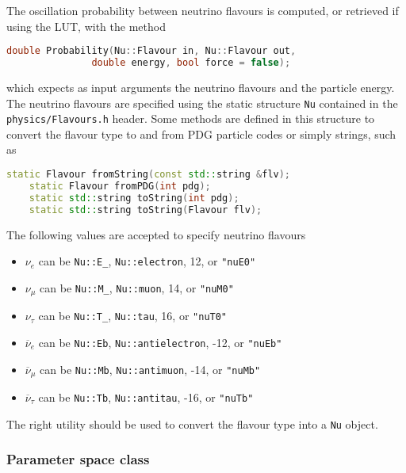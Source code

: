 \documentclass[a4paper, 11pt]{article}
\newcommand{\cj}{\overline}
\begin{document}
The oscillation probability between neutrino flavours is computed, or retrieved if using the LUT, with the method
\begin{lstlisting}[language=C++]
    double Probability(Nu::Flavour in, Nu::Flavour out,
		       double energy, bool force = false);
\end{lstlisting}
which expects as input arguments the neutrino flavours and the particle energy.
The neutrino flavours are specified using the static structure \texttt{Nu} contained in the \texttt{physics/Flavours.h} header.
Some methods are defined in this structure to convert the flavour type to and from PDG particle codes or simply strings,
such as
\begin{lstlisting}[language=C++]
    static Flavour fromString(const std::string &flv);
    static Flavour fromPDG(int pdg);
    static std::string toString(int pdg);
    static std::string toString(Flavour flv);
\end{lstlisting}
The following values are accepted to specify neutrino flavours
\begin{itemize}
		\small
	\item $\nu_e$         can be \texttt{Nu::E\_}, \texttt{Nu::electron}, 12, or \texttt{"nuE0"}
	\item $\nu_\mu$       can be \texttt{Nu::M\_}, \texttt{Nu::muon}, 14, or \texttt{"nuM0"}
	\item $\nu_\tau$      can be \texttt{Nu::T\_}, \texttt{Nu::tau}, 16, or \texttt{"nuT0"}
	\item $\cj{\nu}_e$    can be \texttt{Nu::Eb}, \texttt{Nu::antielectron}, -12, or \texttt{"nuEb"}
	\item $\cj{\nu}_\mu$  can be \texttt{Nu::Mb}, \texttt{Nu::antimuon}, -14, or \texttt{"nuMb"}
	\item $\cj{\nu}_\tau$ can be \texttt{Nu::Tb}, \texttt{Nu::antitau}, -16, or \texttt{"nuTb"}
\end{itemize}
The right utility should be used to convert the flavour type into a \texttt{Nu} object.


\subsubsection{Parameter space class}
\label{sec:paramater_space}
\end{document}
